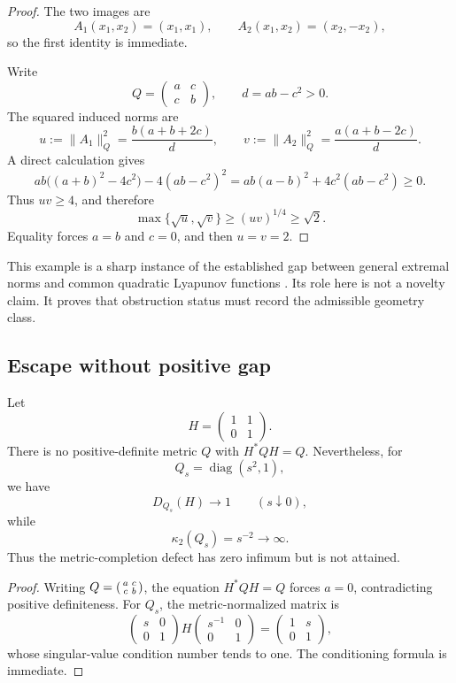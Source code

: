 \begin{proof}
The two images are
\[
 A_1(x_1,x_2)=(x_1,x_1),
 \qquad
 A_2(x_1,x_2)=(x_2,-x_2),
\]
so the first identity is immediate.

Write
\[
 Q=\begin{pmatrix}a&c\\c&b\end{pmatrix},
 \qquad
 d=ab-c^2>0.
\]
The squared induced norms are
\[
 u:=\|A_1\|_Q^2
 =\frac{b(a+b+2c)}{d},
 \qquad
 v:=\|A_2\|_Q^2
 =\frac{a(a+b-2c)}{d}.
\]
A direct calculation gives
\[
 ab\bigl((a+b)^2-4c^2\bigr)-4(ab-c^2)^2
 =ab(a-b)^2+4c^2(ab-c^2)\geq0.
\]
Thus \(uv\geq4\), and therefore
\[
 \max\{\sqrt u,\sqrt v\}\geq(uv)^{1/4}\geq\sqrt2.
\]
Equality forces \(a=b\) and \(c=0\), and then \(u=v=2\).
\end{proof}

This example is a sharp instance of the established gap between general extremal norms and common quadratic Lyapunov functions \cite{AndoShih1998,John1948}.  Its role here is not a novelty claim.  It proves that obstruction status must record the admissible geometry class.

\subsection{Escape without positive gap}
\label{subsec:block19-unipotent-escape}

\begin{proposition}
\label{prop:block19-unipotent-escape}
Let
\[
 H=\begin{pmatrix}1&1\\0&1\end{pmatrix}.
\]
There is no positive-definite metric \(Q\) with \(H^*QH=Q\).  Nevertheless, for
\[
 Q_s=\operatorname{diag}(s^2,1),
\]
we have
\[
 D_{Q_s}(H)\longrightarrow1
 \qquad(s\downarrow0),
\]
while
\[
 \kappa_2(Q_s)=s^{-2}\longrightarrow\infty.
\]
Thus the metric-completion defect has zero infimum but is not attained.
\end{proposition}

\begin{proof}
Writing \(Q=\begin{psmallmatrix}a&c\\c&b\end{psmallmatrix}\), the equation \(H^*QH=Q\) forces \(a=0\), contradicting positive definiteness.  For \(Q_s\), the metric-normalized matrix is
\[
 \begin{pmatrix}s&0\\0&1\end{pmatrix}
 H
 \begin{pmatrix}s^{-1}&0\\0&1\end{pmatrix}
 =
 \begin{pmatrix}1&s\\0&1\end{pmatrix},
\]
whose singular-value condition number tends to one.  The conditioning formula is immediate.
\end{proof}

